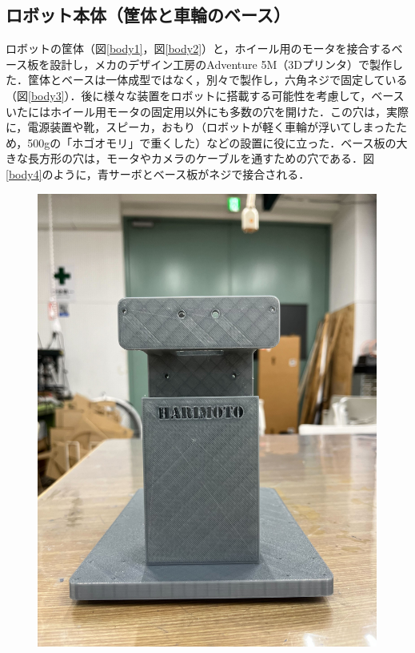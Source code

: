 \documentclass[10pt, oneside, titlepage]{ltjarticle}  %
\begin{document}
  \subsection{ロボット本体（筐体と車輪のベース）}
  ロボットの筐体（図\ref{body1}，図\ref{body2}）と，ホイール用のモータを接合するベース板を設計し，メカのデザイン工房のAdventure 5M（3Dプリンタ）で製作した．筐体とベースは一体成型ではなく，別々で製作し，六角ネジで固定している（図\ref{body3}）．後に様々な装置をロボットに搭載する可能性を考慮して，ベースいたにはホイール用モータの固定用以外にも多数の穴を開けた．この穴は，実際に，電源装置や靴，スピーカ，おもり（ロボットが軽く車輪が浮いてしまったため，500gの「ホゴオモリ」で重くした）などの設置に役に立った．ベース板の大きな長方形の穴は，モータやカメラのケーブルを通すための穴である．図\ref{body4}のように，青サーボとベース板がネジで接合される．
  \begin{figure}[H]
    \centering
    \begin{minipage}{0.48\textwidth}
      \centering
      \includegraphics[width=\textwidth]{figures/body1.jpg}

\end{minipage}
\end{figure}
\end{document}
